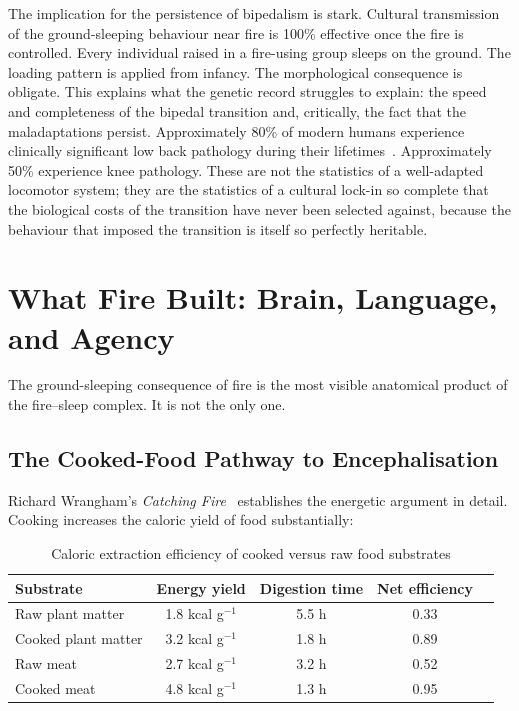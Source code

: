 The implication for the persistence of bipedalism is stark. Cultural transmission of the ground-sleeping behaviour near fire is 100\% effective once the fire is controlled. Every individual raised in a fire-using group sleeps on the ground. The loading pattern is applied from infancy. The morphological consequence is obligate. This explains what the genetic record struggles to explain: the speed and completeness of the bipedal transition and, critically, the fact that the maladaptations persist. Approximately 80\% of modern humans experience clinically significant low back pathology during their lifetimes~\cite{author_bipedalism}. Approximately 50\% experience knee pathology. These are not the statistics of a well-adapted locomotor system; they are the statistics of a cultural lock-in so complete that the biological costs of the transition have never been selected against, because the behaviour that imposed the transition is itself so perfectly heritable.

\bigskip

\section{What Fire Built: Brain, Language, and Agency}

The ground-sleeping consequence of fire is the most visible anatomical product of the fire--sleep complex. It is not the only one.

\subsection{The Cooked-Food Pathway to Encephalisation}

Richard Wrangham's \textit{Catching Fire}~\cite{wrangham2009} establishes the energetic argument in detail. Cooking increases the caloric yield of food substantially:

\begin{table}[h!]
\centering
\caption{Caloric extraction efficiency of cooked versus raw food substrates}
\label{tab:cooking}
\begin{tabular}{lcccc}
\toprule
Substrate & Energy yield & Digestion time & Net efficiency \\
\midrule
Raw plant matter & 1.8 kcal g$^{-1}$ & 5.5 h & 0.33 \\
Cooked plant matter & 3.2 kcal g$^{-1}$ & 1.8 h & 0.89 \\
Raw meat & 2.7 kcal g$^{-1}$ & 3.2 h & 0.52 \\
Cooked meat & 4.8 kcal g$^{-1}$ & 1.3 h & 0.95 \\
\bottomrule
\end{tabular}
\end{table}

